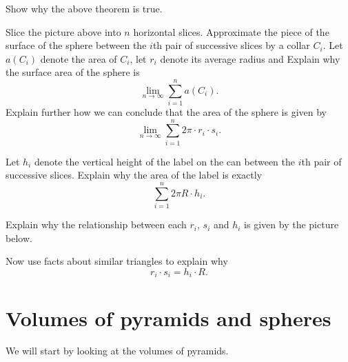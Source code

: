 \documentclass[newpage,hints,handout]{ximera}
\begin{document}
\begin{problem}
Show why the above theorem is true.

\begin{hint}
Slice the picture above into $n$ horizontal slices. Approximate the
piece of the surface of the sphere between the $i$th pair of
successive slices by a collar $C_{i}$. Let $a\left( C_{i}\right) $
denote the area of $C_{i}$, let $r_{i}$ denote its average radius and
Explain why the surface area of the sphere is
\[
\lim_{n\to \infty}\sum_{i=1}^{n} a(C_i).
\]
Explain further how we can conclude that the area of the sphere is
given by
\[%
\lim_{n\to \infty}\sum_{i=1}^{n} 2\pi\cdot r_{i}\cdot s_{i}.
\]

\end{hint}
\begin{hint}
Let $h_{i}$ denote the vertical height of the label on the can between
the $i$th pair of successive slices. Explain why the area of the label is exactly%
\[%
\sum_{i=1}^{n} 2\pi R \cdot h_{i}.
\]
\end{hint}
\begin{hint}
Explain why the relationship between each $r_{i}$, $s_{i}$ and $h_{i}$
is given by the picture below.
\begin{image}
\end{image}
Now use facts about similar triangles to explain why
\[
r_{i}\cdot s_{i}=h_{i}\cdot R.
\]
\end{hint}
\end{problem}




\section{Volumes of pyramids and spheres}

We will start by looking at the volumes of pyramids.
\end{document}
